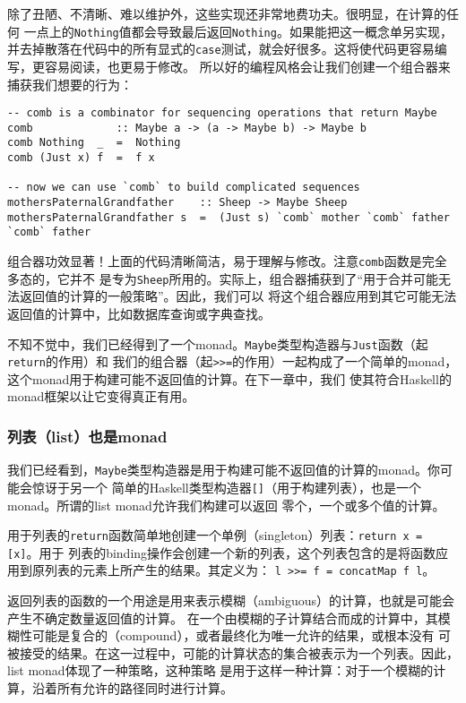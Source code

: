 \indent{}除了丑陋、不清晰、难以维护外，这些实现还非常地费功夫。很明显，在计算的任何
一点上的\texttt{Nothing}值都会导致最后返回\texttt{Nothing}。如果能把这一概念单另实现，
并去掉散落在代码中的所有显式的\texttt{case}测试，就会好很多。这将使代码更容易编写，更容易阅读，也更易于修改。
所以好的编程风格会让我们创建一个组合器来捕获我们想要的行为：
\begin{verbatim}
-- comb is a combinator for sequencing operations that return Maybe
comb             :: Maybe a -> (a -> Maybe b) -> Maybe b
comb Nothing  _  =  Nothing
comb (Just x) f  =  f x

-- now we can use `comb` to build complicated sequences
mothersPaternalGrandfather    :: Sheep -> Maybe Sheep
mothersPaternalGrandfather s  =  (Just s) `comb` mother `comb` father `comb` father
\end{verbatim}
\noindent{}组合器功效显著！上面的代码清晰简洁，易于理解与修改。注意\texttt{comb}函数是完全多态的，它并不
是专为\texttt{Sheep}所用的。实际上，组合器捕获到了“用于合并可能无法返回值的计算的一般策略”。因此，我们可以
将这个组合器应用到其它可能无法返回值的计算中，比如数据库查询或字典查找。

\indent{}不知不觉中，我们已经得到了一个monad。\texttt{Maybe}类型构造器与\texttt{Just}函数（起\texttt{return}的作用）和
我们的组合器（起\texttt{>>=}的作用）一起构成了一个简单的monad，这个monad用于构建可能不返回值的计算。在下一章中，我们
使其符合Haskell的monad框架以让它变得真正有用。

\subsubsection{列表（list）也是monad}
\indent{}我们已经看到，\texttt{Maybe}类型构造器是用于构建可能不返回值的计算的monad。你可能会惊讶于另一个
简单的Haskell类型构造器\texttt{[]}（用于构建列表），也是一个monad。所谓的list monad允许我们构建可以返回
零个，一个或多个值的计算。

\indent{}用于列表的\texttt{return}函数简单地创建一个单例（singleton）列表：\texttt{return x = [x]}。用于
列表的binding操作会创建一个新的列表，这个列表包含的是将函数应用到原列表的元素上所产生的结果。其定义为：
\texttt{l >>= f = concatMap f l}。

\indent{}返回列表的函数的一个用途是用来表示模糊（ambiguous）的计算，也就是可能会产生不确定数量返回值的计算。
在一个由模糊的子计算结合而成的计算中，其模糊性可能是复合的（compound），或者最终化为唯一允许的结果，或根本没有
可被接受的结果。在这一过程中，可能的计算状态的集合被表示为一个列表。因此，list monad体现了一种策略，这种策略
是用于这样一种计算：对于一个模糊的计算，沿着所有允许的路径同时进行计算。

